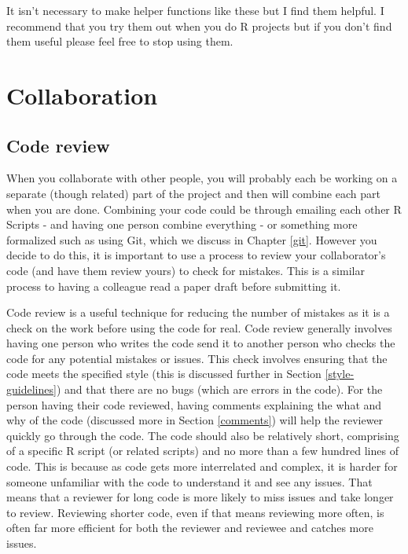 \documentclass[
]{krantz}
\begin{document}
It isn't necessary to make helper functions like these but I find them helpful. I recommend that you try them out when you do R projects but if you don't find them useful please feel free to stop using them.

\hypertarget{collaboration}{%
\chapter{Collaboration}\label{collaboration}}

\hypertarget{code-review}{%
\section{Code review}\label{code-review}}

When you collaborate with other people, you will probably each be working on a separate (though related) part of the project and then will combine each part when you are done. Combining your code could be through emailing each other R Scripts - and having one person combine everything - or something more formalized such as using Git, which we discuss in Chapter \ref{git}. However you decide to do this, it is important to use a process to review your collaborator's code (and have them review yours) to check for mistakes. This is a similar process to having a colleague read a paper draft before submitting it.

Code review is a useful technique for reducing the number of mistakes as it is a check on the work before using the code for real. Code review generally involves having one person who writes the code send it to another person who checks the code for any potential mistakes or issues. This check involves ensuring that the code meets the specified style (this is discussed further in Section \ref{style-guidelines}) and that there are no bugs (which are errors in the code). For the person having their code reviewed, having comments explaining the what and why of the code (discussed more in Section \ref{comments}) will help the reviewer quickly go through the code. The code should also be relatively short, comprising of a specific R script (or related scripts) and no more than a few hundred lines of code. This is because as code gets more interrelated and complex, it is harder for someone unfamiliar with the code to understand it and see any issues. That means that a reviewer for long code is more likely to miss issues and take longer to review. Reviewing shorter code, even if that means reviewing more often, is often far more efficient for both the reviewer and reviewee and catches more issues.
\end{document}
